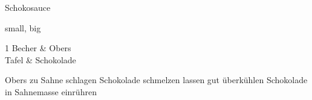 \begin{recipe}
{Schokosauce}
    
    \graph
    {
        small,
        big
    }
    
    \ingredients
    {
	    1 Becher & Obers \\  Tafel & Schokolade
    }
    
    \preparation
    {
    	\step Obers zu Sahne schlagen
		\step Schokolade schmelzen lassen
		\step gut überkühlen
		\step Schokolade in Sahnemasse einrühren
    }
\end{recipe}